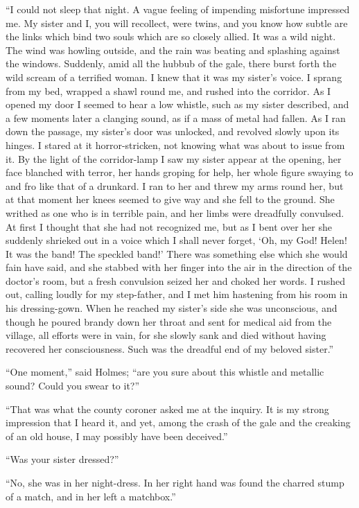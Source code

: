 “I could not sleep that night. A vague feeling of impending
misfortune impressed me. My sister and I, you will recollect,
were twins, and you know how subtle are the links
which bind two souls which are so closely allied. It was a
wild night. The wind was howling outside, and the rain was
beating and splashing against the windows. Suddenly, amid
all the hubbub of the gale, there burst forth the wild scream
of a terrified woman. I knew that it was my sister’s voice.
I sprang from my bed, wrapped a shawl round me, and rushed
into the corridor. As I opened my door I seemed to hear a
low whistle, such as my sister described, and a few moments
later a clanging sound, as if a mass of metal had fallen. As
I ran down the passage, my sister’s door was unlocked, and
revolved slowly upon its hinges. I stared at it horror-stricken,
not knowing what was about to issue from it. By the light of
the corridor-lamp I saw my sister appear at the opening, her
face blanched with terror, her hands groping for help, her
whole figure swaying to and fro like that of a drunkard. I ran
to her and threw my arms round her, but at that moment her
knees seemed to give way and she fell to the ground. She
writhed as one who is in terrible pain, and her limbs were
dreadfully convulsed. At first I thought that she had not
recognized me, but as I bent over her she suddenly shrieked
out in a voice which I shall never forget, ‘Oh, my God!
Helen! It was the band! The speckled band!’ There was
something else which she would fain have said, and she
stabbed with her finger into the air in the direction of the
doctor’s room, but a fresh convulsion seized her and choked
her words. I rushed out, calling loudly for my step-father,
and I met him hastening from his room in his dressing-gown.
When he reached my sister’s side she was unconscious, and
though he poured brandy down her throat and sent for medical
aid from the village, all efforts were in vain, for she slowly
sank and died without having recovered her consciousness.
Such was the dreadful end of my beloved sister.”

“One moment,” said Holmes; “are you sure about this
whistle and metallic sound? Could you swear to it?”

“That was what the county coroner asked me at the inquiry.
It is my strong impression that I heard it, and yet, among
the crash of the gale and the creaking of an old house, I may
possibly have been deceived.”

“Was your sister dressed?”

“No, she was in her night-dress. In her right hand was
found the charred stump of a match, and in her left a
matchbox.”

